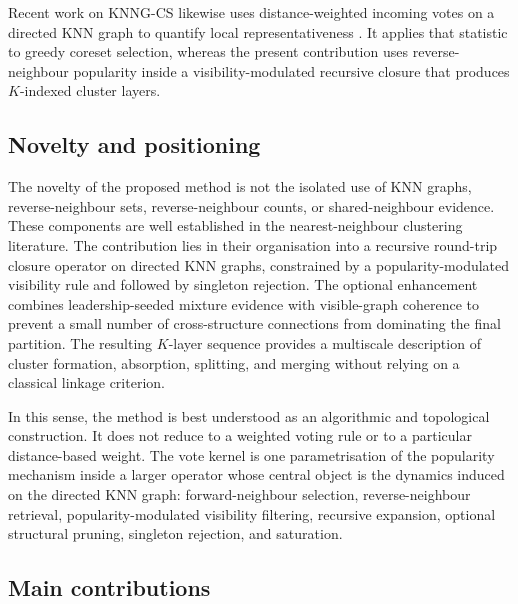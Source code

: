 \documentclass[pdflatex,sn-mathphys-num]{sn-jnl}
\begin{document}
Recent work on KNNG-CS likewise uses distance-weighted incoming votes on a directed KNN graph to quantify local representativeness \citep{LiuEtAl2026KNNGCS}. It applies that statistic to greedy coreset selection, whereas the present contribution uses reverse-neighbour popularity inside a visibility-modulated recursive closure that produces $K$-indexed cluster layers.

\subsection{Novelty and positioning}

The novelty of the proposed method is not the isolated use of KNN graphs, reverse-neighbour sets, reverse-neighbour counts, or shared-neighbour evidence. These components are well established in the nearest-neighbour clustering literature. The contribution lies in their organisation into a recursive round-trip closure operator on directed KNN graphs, constrained by a popularity-modulated visibility rule and followed by singleton rejection. The optional enhancement combines leadership-seeded mixture evidence with visible-graph coherence to prevent a small number of cross-structure connections from dominating the final partition. The resulting $K$-layer sequence provides a multiscale description of cluster formation, absorption, splitting, and merging without relying on a classical linkage criterion.

In this sense, the method is best understood as an algorithmic and topological construction. It does not reduce to a weighted voting rule or to a particular distance-based weight. The vote kernel is one parametrisation of the popularity mechanism inside a larger operator whose central object is the dynamics induced on the directed KNN graph: forward-neighbour selection, reverse-neighbour retrieval, popularity-modulated visibility filtering, recursive expansion, optional structural pruning, singleton rejection, and saturation.

\subsection{Main contributions}
\end{document}
